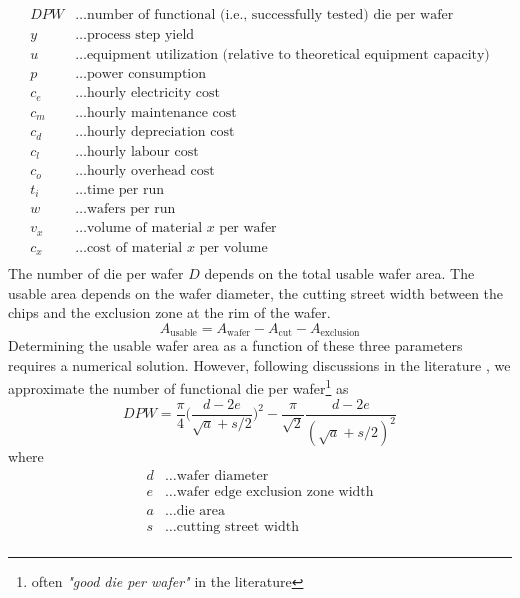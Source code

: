 \documentclass[parskip=full]{article}
\begin{document}
\begin{align*}
        DPW &\dots \text{number of functional (i.e., successfully tested) die per wafer}\\
        y &\dots \text{process step yield} \\
        u &\dots \text{equipment utilization (relative to theoretical equipment capacity)} \\
        p &\dots \text{power consumption} \\
        c_e &\dots \text{hourly electricity cost} \\
        c_m &\dots \text{hourly maintenance cost} \\
        c_d &\dots \text{hourly depreciation cost}\\
        c_l &\dots \text{hourly labour cost} \\
        c_o &\dots \text{hourly overhead cost} \\
        t_i &\dots \text{time per run} \\
        w &\dots \text{wafers per run} \\
        v_x &\dots \text{volume of material $x$ per wafer} \\
        c_x &\dots \text{cost of material $x$ per volume}\\
\end{align*}
%
The number of die per wafer $D$ depends on the total usable wafer area. The usable area depends on the wafer diameter, the cutting street width between the chips and the exclusion zone at the rim of the wafer.
%
\begin{equation}
	A_{\text{usable}}=A_{\text{wafer}}-A_{\text{cut}}-A_{\text{exclusion}}
\end{equation}
%
Determining the usable wafer area as a function of these three parameters requires a numerical solution. However, following discussions in the literature \cite{de2005investigation}, we approximate the number of functional die per wafer\footnote{often \textit{"good die per wafer"} in the literature} as
%
\begin{equation}
\label{eqn:dpw}
	DPW = \frac{\pi}{4}  \bigg ( \frac{d-2e}{\sqrt{a}+s/2} \bigg ) ^2 - \frac{\pi}{\sqrt{2}}\frac{d-2e}{(\sqrt{a}+s/2)^2}
\end{equation}
%
where
%
\begin{align*}
    d &\dots \text{wafer diameter} \\
    e &\dots \text{wafer edge exclusion zone width} \\
    a &\dots \text{die area} \\
    s &\dots \text{cutting street width} \\
\end{align*}
\end{document}
